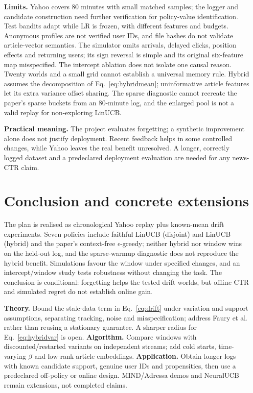 \documentclass[10pt,a4paper]{article}
\begin{document}
\textbf{Limits.} Yahoo covers 80 minutes with small matched samples; the
logger and candidate construction need further verification for
policy-value identification. Test bandits adapt while LR is frozen, with
different features and budgets. Anonymous profiles are not verified user
IDs, and file hashes do not validate article-vector semantics. The
simulator omits arrivals, delayed clicks, position effects and returning
users; its sign reversal is simple and its original six-feature map
misspecified. The intercept ablation does not isolate one causal reason.
Twenty worlds and a small grid cannot establish a universal memory rule.
Hybrid assumes the decomposition of Eq.~\eqref{eq:hybridmean}; uninformative
article features let its extra variance offset sharing. The sparse
diagnostic cannot recreate the paper's sparse buckets from an 80-minute
log, and the enlarged pool is not a valid replay for non-exploring LinUCB.

\textbf{Practical meaning.} The project evaluates forgetting; a
synthetic improvement alone does not justify deployment. Recent feedback
helps in some controlled changes, while Yahoo leaves the real benefit
unresolved. A longer, correctly logged dataset and a predeclared
deployment evaluation are needed for any news-CTR claim.

\section{Conclusion and concrete extensions}
The plan is realised as chronological Yahoo replay plus known-mean drift
experiments. Seven policies include faithful LinUCB (disjoint) and LinUCB
(hybrid) and the paper's context-free $\epsilon$-greedy; neither hybrid nor
window wins on the held-out log, and the sparse-warmup diagnostic does not
reproduce the hybrid benefit. Simulations favour the window under specified
changes, and an intercept/window study tests robustness without changing
the task. The conclusion is conditional: forgetting helps the tested drift
worlds, but offline CTR and simulated regret do not establish online gain.

\textbf{Theory.} Bound the stale-data term in Eq.~\eqref{eq:drift} under
variation and support assumptions, separating tracking, noise and
misspecification; address Faury et al. \cite{faury2021} rather than reusing
a stationary guarantee. A sharper radius for Eq.~\eqref{eq:hybridvar} is
open. \textbf{Algorithm.} Compare windows with discounted/restarted variants
on independent streams; add cold starts, time-varying $\beta$ and low-rank
article embeddings. \textbf{Application.} Obtain longer logs with known
candidate support, genuine user IDs and propensities, then use a
predeclared off-policy or online design. MIND/Adressa demos and NeuralUCB
remain extensions, not completed claims.
\end{document}
